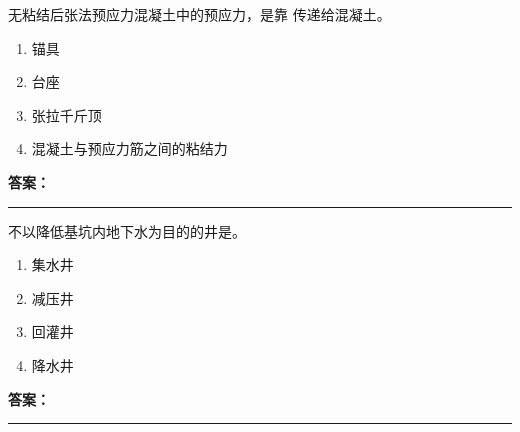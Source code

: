 \documentclass[UTF8,fontset=fandol,11pt]{ctexart}
\newcommand{\answerline}{\textcolor{answerred}{\rule{2.4cm}{0.7pt}}}
\begin{document}
\begin{quizbox}[title={乱序第 50 题｜第五章预应力混凝土工程}]

无粘结后张法预应力混凝土中的预应力，是靠 传递给混凝土。\\

\begin{enumerate}[label=\Alph*.]

\item 锚具

\item 台座

\item 张拉千斤顶

\item 混凝土与预应力筋之间的粘结力

\end{enumerate}

\textbf{\textcolor{answerred}{答案：}} \answerline

\end{quizbox}

\vspace{0.2em}

\begin{quizbox}[title={乱序第 51 题｜第三章基坑工程}]

不以降低基坑内地下水为目的的井是。\\

\begin{enumerate}[label=\Alph*.]

\item 集水井

\item 减压井

\item 回灌井

\item 降水井

\end{enumerate}

\textbf{\textcolor{answerred}{答案：}} \answerline

\end{quizbox}

\vspace{0.2em}
\end{document}
